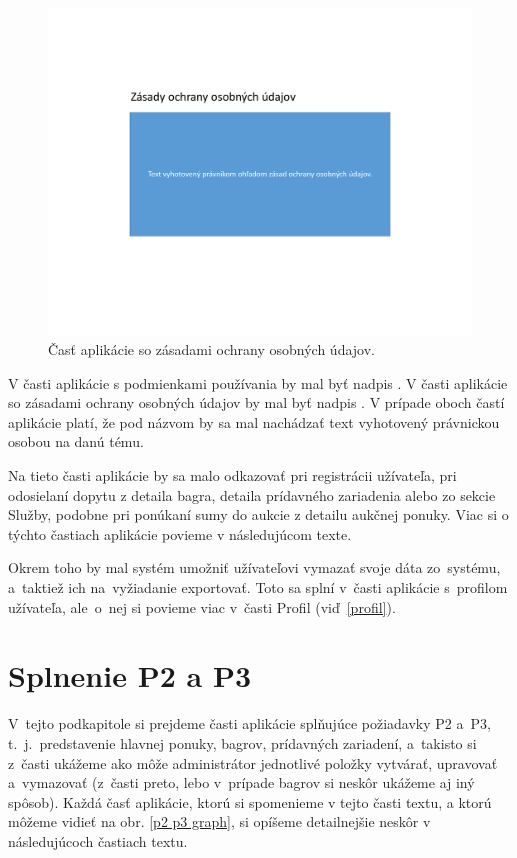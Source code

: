\begin{figure}[H]\centering
\includegraphics[width=140mm]{../img/UI concept/gdpr2}
\caption{Časť aplikácie so zásadami ochrany osobných údajov.}
\label{gdpr2}
\end{figure}

V časti aplikácie s podmienkami používania by mal byť nadpis . V časti aplikácie so zásadami ochrany osobných údajov by mal byť nadpis . V prípade oboch častí aplikácie platí, že pod názvom by sa mal nachádzať text vyhotovený právnickou osobou na danú tému.

Na tieto časti aplikácie by sa malo odkazovať pri registrácii užívateľa, pri odosielaní dopytu z detaila bagra, detaila prídavného zariadenia alebo zo sekcie Služby, podobne pri ponúkaní sumy do aukcie z detailu aukčnej ponuky. Viac si o týchto častiach aplikácie povieme v následujúcom texte.

Okrem toho by mal systém umožniť užívateľovi vymazať svoje dáta zo~systému, a~taktiež ich na~vyžiadanie exportovať. Toto sa splní v~časti aplikácie s~profilom užívateľa, ale~o~nej si povieme viac v~časti Profil (viď~\ref{profil}).

\section{Splnenie P2 a P3}

V~tejto podkapitole si prejdeme časti aplikácie splňujúce požiadavky P2 a~P3, t.~j.~predstavenie hlavnej ponuky, bagrov, prídavných zariadení, a~takisto si z~časti ukážeme ako môže administrátor jednotlivé položky vytvárať, upravovať a~vymazovať (z~časti preto, lebo v~prípade bagrov si neskôr ukážeme aj iný spôsob). Každá časť aplikácie, ktorú si spomenieme v tejto časti textu, a ktorú môžeme vidieť na obr. \ref{p2 p3 graph}, si opíšeme detailnejšie neskôr v následujúcoch častiach textu.

